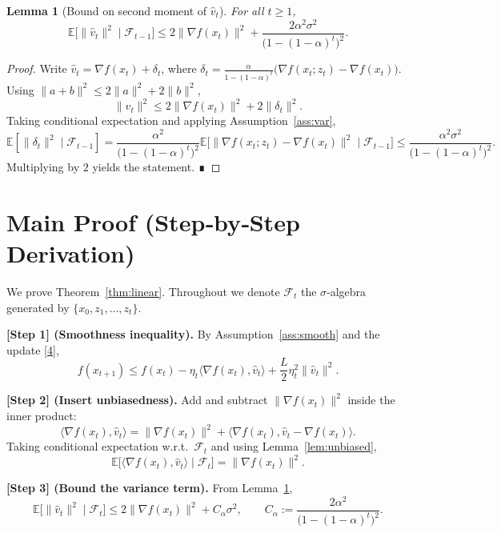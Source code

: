 \documentclass{article}
\newtheorem{lemma}{Lemma}
\newcommand{\E}{\mathbb{E}}
\begin{document}
\begin{lemma}[Bound on second moment of $\hat v_{t}$]\label{lem:varbound}
For all $t\ge1$,
\[
\E\!\bigl[\|\hat v_{t}\|^{2}\mid\mathcal F_{t-1}\bigr]
   \le 2\|\nabla f(x_{t})\|^{2}
      +\frac{2\alpha^{2}\sigma^{2}}{\bigl(1-(1-\alpha)^{t}\bigr)^{2}} .
\]
\end{lemma}
\begin{proof}
Write $\hat v_{t}= \nabla f(x_{t}) + \delta_{t}$,
where $\delta_{t}= \frac{\alpha}{1-(1-\alpha)^{t}}
\bigl(\nabla f(x_{t};z_{t})-\nabla f(x_{t})\bigr)$.
Using $\|a+b\|^{2}\le2\|a\|^{2}+2\|b\|^{2}$,
\[
\|\hat v_{t}\|^{2}\le2\|\nabla f(x_{t})\|^{2}
                 +2\|\delta_{t}\|^{2}.
\]
Taking conditional expectation and applying Assumption~\ref{ass:var},
\[
\E[\|\delta_{t}\|^{2}\mid\mathcal F_{t-1}]
   =\frac{\alpha^{2}}{\bigl(1-(1-\alpha)^{t}\bigr)^{2}}
     \E\!\bigl[\|\nabla f(x_{t};z_{t})-\nabla f(x_{t})\|^{2}\mid\mathcal F_{t-1}\bigr]
   \le\frac{\alpha^{2}\sigma^{2}}{\bigl(1-(1-\alpha)^{t}\bigr)^{2}} .
\]
Multiplying by $2$ yields the statement. ∎
\end{proof}

\section*{Main Proof (Step‑by‑Step Derivation)}
We prove Theorem~\ref{thm:linear}.  Throughout we denote
$\mathcal F_{t}$ the $\sigma$‑algebra generated by
$\{x_{0},z_{1},\dots ,z_{t}\}$.

\noindent\textbf{[Step 1] (Smoothness inequality).}
By Assumption~\ref{ass:smooth} and the update \eqref{4},
\begin{equation}
f(x_{t+1})\le f(x_{t})
      -\eta_{t}\langle\nabla f(x_{t}),\hat v_{t}\rangle
      +\frac{L}{2}\eta_{t}^{2}\|\hat v_{t}\|^{2}. \tag{5}
\end{equation}

\noindent\textbf{[Step 2] (Insert unbiasedness).}
Add and subtract $\|\nabla f(x_{t})\|^{2}$ inside the inner product:
\[
\langle\nabla f(x_{t}),\hat v_{t}\rangle
 =\|\nabla f(x_{t})\|^{2}
   +\langle\nabla f(x_{t}),\hat v_{t}-\nabla f(x_{t})\rangle.
\]
Taking conditional expectation w.r.t.\ $\mathcal F_{t}$ and using
Lemma~\ref{lem:unbiased},
\[
\E\!\bigl[\langle\nabla f(x_{t}),\hat v_{t}\rangle\mid\mathcal F_{t}\bigr]
   =\|\nabla f(x_{t})\|^{2}. \tag{6}
\]

\noindent\textbf{[Step 3] (Bound the variance term).}
From Lemma~\ref{lem:varbound},
\[
\E\!\bigl[\|\hat v_{t}\|^{2}\mid\mathcal F_{t}\bigr]
   \le 2\|\nabla f(x_{t})\|^{2}+C_{\alpha}\sigma^{2},
\qquad
C_{\alpha}:=\frac{2\alpha^{2}}{\bigl(1-(1-\alpha)^{t}\bigr)^{2}}.
\tag{7}
\]
\end{document}
